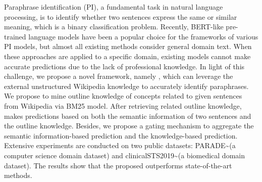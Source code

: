 Paraphrase identification (PI), a fundamental task in natural language processing, is to identify whether two sentences express the same or similar meaning, which is a binary classification problem. Recently, BERT-like pre-trained language models have been a popular choice for the frameworks of various PI models, but almost all existing methods consider general domain text. When these approaches are applied to a specific domain, existing models cannot make accurate predictions due to the lack of professional knowledge. In light of this challenge, we propose a novel framework, namely {\name}, which can leverage the external unstructured Wikipedia knowledge to accurately identify paraphrases. We propose to mine outline knowledge of concepts related to given sentences from Wikipedia via BM25 model. After retrieving related outline knowledge, {\name} makes predictions based on both the semantic information of two sentences and the outline knowledge. Besides, we propose a gating mechanism to aggregate the semantic information-based prediction and the knowledge-based prediction. Extensive experiments are conducted on two public datasets: PARADE{\textasciitilde}(a computer science domain dataset) and clinicalSTS2019{\textasciitilde}(a biomedical domain dataset). The results show that the proposed {\name} outperforms state-of-the-art methods.
